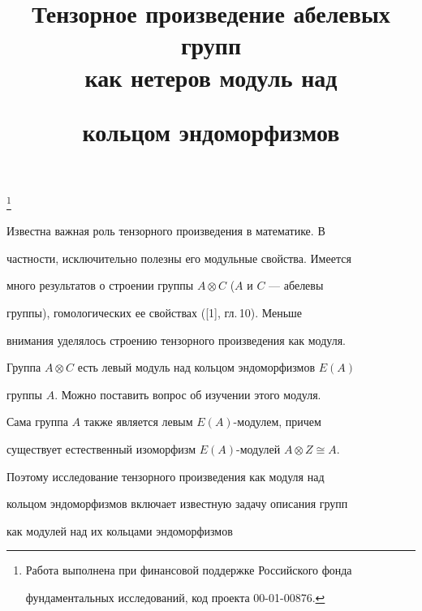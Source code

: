

\title{Тензорное произведение абелевых групп\\ как нетеров модуль над 


кольцом эндоморфизмов} 


\thanks{Работа выполнена при финансовой поддержке Российского фонда 


фундаментальных исследований, код проекта 00-01-00876.} 


 


\date{}  




\pagestyle{plain} %


  




\maketitle  


\label{begin}  


 


Известна важная роль тензорного произведения в математике. В 


частности, исключительно полезны его модульные свойства. Имеется 


много результатов о строении группы $A\otimes C$ ($A$ и $C$ --- абелевы 


группы), гомологических ее свойствах ([1], гл.\,10). Меньше 


внимания уделялось строению тензорного произведения как модуля. 


Группа $A\otimes C$ есть левый модуль над кольцом эндоморфизмов $E(A)$ 


группы $A$. Можно поставить вопрос об изучении этого модуля. 


Сама группа $A$ также является левым $E(A)$-модулем, причем 


существует естественный изоморфизм $E(A)$-модулей $A\otimes Z\cong A$. 


Поэтому исследование тензорного произведения как модуля над 


кольцом эндоморфизмов включает известную задачу описания групп 


как модулей над их кольцами эндоморфизмов 


